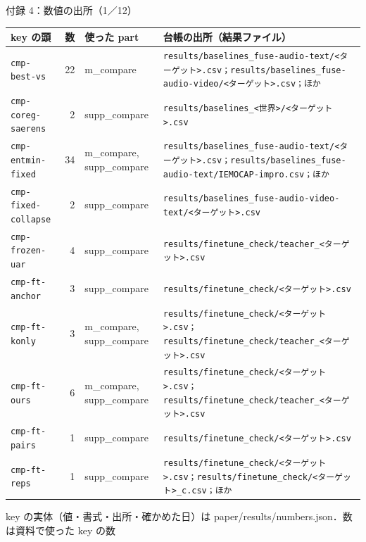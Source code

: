 \begin{frame}{付録 4：数値の出所（1／12）}
  \label{a:sources}
  \vspace{-0.3em}\centering\tiny\renewcommand{\arraystretch}{1.0}
  \begin{tabularx}{\textwidth}{@{}l r l X@{}}
    \toprule key の頭 & 数 & 使った part & 台帳の出所（結果ファイル） \\ \midrule
    \texttt{cmp-best-vs} & 22 & m\_compare & \texttt{results/\allowbreak{}baselines\_\allowbreak{}fuse-audio-text/\allowbreak{}<ターゲット>.csv；results/\allowbreak{}baselines\_\allowbreak{}fuse-audio-video/\allowbreak{}<ターゲット>.csv；ほか} \\
    \texttt{cmp-coreg-saerens} & 2 & supp\_compare & \texttt{results/\allowbreak{}baselines\_\allowbreak{}<世界>/\allowbreak{}<ターゲット>.csv} \\
    \texttt{cmp-entmin-fixed} & 34 & m\_compare, supp\_compare & \texttt{results/\allowbreak{}baselines\_\allowbreak{}fuse-audio-text/\allowbreak{}<ターゲット>.csv；results/\allowbreak{}baselines\_\allowbreak{}fuse-audio-text/\allowbreak{}IEMOCAP-impro.csv；ほか} \\
    \texttt{cmp-fixed-collapse} & 2 & supp\_compare & \texttt{results/\allowbreak{}baselines\_\allowbreak{}fuse-audio-video-text/\allowbreak{}<ターゲット>.csv} \\
    \texttt{cmp-frozen-uar} & 4 & supp\_compare & \texttt{results/\allowbreak{}finetune\_\allowbreak{}check/\allowbreak{}teacher\_\allowbreak{}<ターゲット>.csv} \\
    \texttt{cmp-ft-anchor} & 3 & supp\_compare & \texttt{results/\allowbreak{}finetune\_\allowbreak{}check/\allowbreak{}<ターゲット>.csv} \\
    \texttt{cmp-ft-konly} & 3 & m\_compare, supp\_compare & \texttt{results/\allowbreak{}finetune\_\allowbreak{}check/\allowbreak{}<ターゲット>.csv；results/\allowbreak{}finetune\_\allowbreak{}check/\allowbreak{}teacher\_\allowbreak{}<ターゲット>.csv} \\
    \texttt{cmp-ft-ours} & 6 & m\_compare, supp\_compare & \texttt{results/\allowbreak{}finetune\_\allowbreak{}check/\allowbreak{}<ターゲット>.csv；results/\allowbreak{}finetune\_\allowbreak{}check/\allowbreak{}teacher\_\allowbreak{}<ターゲット>.csv} \\
    \texttt{cmp-ft-pairs} & 1 & supp\_compare & \texttt{results/\allowbreak{}finetune\_\allowbreak{}check/\allowbreak{}<ターゲット>.csv} \\
    \texttt{cmp-ft-reps} & 1 & supp\_compare & \texttt{results/\allowbreak{}finetune\_\allowbreak{}check/\allowbreak{}<ターゲット>.csv；results/\allowbreak{}finetune\_\allowbreak{}check/\allowbreak{}<ターゲット>\_\allowbreak{}c.csv；ほか} \\
    \bottomrule
  \end{tabularx}\par
  {\raggedright\tiny key の実体（値・書式・出所・確かめた日）は paper/results/numbers.json．数は資料で使った key の数\par}
\end{frame}
